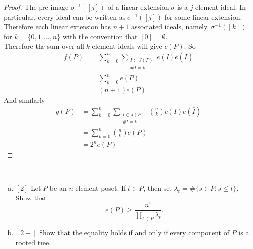 \documentclass{article}
\newenvironment{problem}[2][Problem]{\begin{trivlist}
\item[\hskip \labelsep {\bfseries #1}\hskip \labelsep {\bfseries #2.}]}{\end{trivlist}}
\newcommand{\set}[1]{\{ #1 \}}
\begin{document}
\begin{proof}
  The pre-image $\sigma^{-1}([j])$ of a linear extension $\sigma$ is a
  $j$-element ideal. In particular, every ideal can be written as
  $\sigma^{-1}([j])$ for some linear extension.
  Therefore each linear extension has $n+1$ associated ideals, namely,
  $\sigma^{-1}([k])$ for $k = \set{0, 1, \hdots, n}$ with the convention that
  $[0] = \emptyset$.
  \\
  Therefore the sum over all $k$-element ideals will give $e(P)$.
  So
  \begin{align*}
    f(P) &= \sum_{k=0}^n \sum_{\substack{I \subset J(P) \\ \#I = k}} e(I)e(\bar I) \\
         &= \sum_{k=0}^n e(P) \\
         &= (n + 1) e(P)
  \end{align*}
  And similarly \begin{align*}
    g(P) &= \sum_{k=0}^n \sum_{\substack{I \subset J(P) \\ \#I = k}} \binom nk e(I)e(\bar I) \\
         &= \sum_{k=0}^n \binom nk e(P) \\
         &= 2^n e(P)
  \end{align*}
\end{proof}
\pagebreak
\begin{problem}{57} ~
  \begin{enumerate}[a.]
    \item $[2]$ Let $P$ be an $n$-element poset. If $t \in P$, then set
    $\lambda_t = \#\{s \in P : s \leq t\}$.
    Show that \[
      e(P) \geq \frac{n!}{ \prod_{t \in P} \lambda_t}.
    \]
    \item $[2+]$ Show that the equality holds if and only if every component of $P$ is
    a rooted tree.
  \end{enumerate}
\end{problem}
\end{document}
